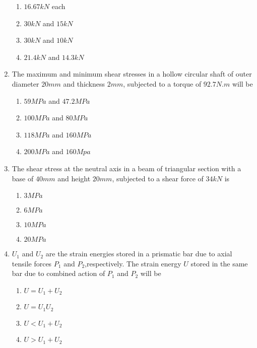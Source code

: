 \documentclass[journal,12pt,onecolumn]{IEEEtran}
\theoremstyle{remark}
\begin{document}
\begin{enumerate}[start=18]
\begin{enumerate}
                \item $16.67 kN$ each
                \item $30 kN$ and $15 kN$
                \item $30 kN$ and $10 kN$
                \item $21.4 kN$ and $14.3 kN$
        \end{enumerate}
\item The maximum and minimum shear stresses in a hollow circular shaft of outer diameter $20 mm$ and thickness $2 mm$, subjected to a torque of $92.7 N.m$ will be
	\begin{enumerate}
                \item $59 MPa$ and $47.2MPa$
                \item $100 MPa$ and $80 MPa$
                \item $118 MPa$ and $160 MPa$
                \item $200 MPa$ and $160 Mpa$
        \end{enumerate}
\item The shear stress at the neutral axis in a beam of triangular section with a base of $40 mm$ and height $20 mm$, subjected to a shear force of $34 kN$ is
	\begin{enumerate}
                \item $3 MPa$
                \item $6 MPa$
                \item $10 MPa$
                \item $20 MPa$
        \end{enumerate}
\item $U_1$ and $U_2$ are the strain energies stored in a prismatic bar due to axial tensile forces $P_1$ and $P_2$,respectively. The strain energy $U$ stored in the same bar due to combined action of $P_1$ and $P_2$ will be 
\begin{enumerate}
                \item $U=U_1+U_2$
                \item $U=U_1U_2$ 
                \item $U<U_1+U_2$ 
                \item $U>U_1+U_2$ 
        \end{enumerate}     

\end{enumerate}
\end{document}
